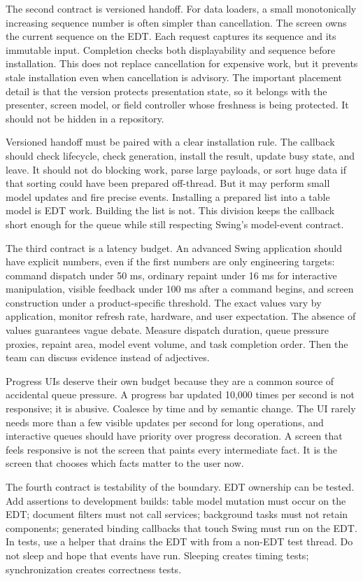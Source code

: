 The second contract is versioned handoff. For data loaders, a small monotonically increasing sequence number is often simpler than cancellation. The screen owns the current sequence on the EDT. Each request captures its sequence and its immutable input. Completion checks both displayability and sequence before installation. This does not replace cancellation for expensive work, but it prevents stale installation even when cancellation is advisory. The important placement detail is that the version protects presentation state, so it belongs with the presenter, screen model, or field controller whose freshness is being protected. It should not be hidden in a repository.

Versioned handoff must be paired with a clear installation rule. The callback should check lifecycle, check generation, install the result, update busy state, and leave. It should not do blocking work, parse large payloads, or sort huge data if that sorting could have been prepared off-thread. But it may perform small model updates and fire precise events. Installing a prepared list into a table model is EDT work. Building the list is not. This division keeps the callback short enough for the queue while still respecting Swing's model-event contract.

The third contract is a latency budget. An advanced Swing application should have explicit numbers, even if the first numbers are only engineering targets: command dispatch under 50 ms, ordinary repaint under 16 ms for interactive manipulation, visible feedback under 100 ms after a command begins, and screen construction under a product-specific threshold. The exact values vary by application, monitor refresh rate, hardware, and user expectation. The absence of values guarantees vague debate. Measure dispatch duration, queue pressure proxies, repaint area, model event volume, and task completion order. Then the team can discuss evidence instead of adjectives.

Progress UIs deserve their own budget because they are a common source of accidental queue pressure. A progress bar updated 10,000 times per second is not responsive; it is abusive. Coalesce by time and by semantic change. The UI rarely needs more than a few visible updates per second for long operations, and interactive queues should have priority over progress decoration. A screen that feels responsive is not the screen that paints every intermediate fact. It is the screen that chooses which facts matter to the user now.

The fourth contract is testability of the boundary. EDT ownership can be tested. Add assertions to development builds: table model mutation must occur on the EDT; document filters must not call services; background tasks must not retain components; generated binding callbacks that touch Swing must run on the EDT. In tests, use a helper that drains the EDT with  from a non-EDT test thread. Do not sleep and hope that events have run. Sleeping creates timing tests; synchronization creates correctness tests.

